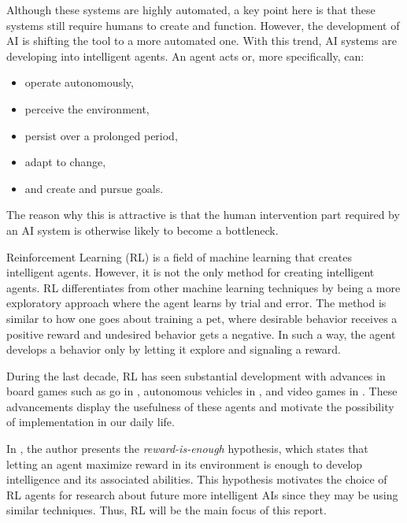 \documentclass[12pt,A4]{report}
\theoremstyle{definition}
\begin{document}
Although these systems are highly automated, a key point here is that these systems still require humans to create and function. However, the development of AI is shifting the tool to a more automated one. With this trend, AI systems are developing into intelligent agents. An agent acts or, more specifically, can:
\begin{itemize}
  \item operate autonomously,
  \item perceive the environment,
  \item persist over a prolonged period,
  \item adapt to change,
  \item and create and pursue goals.
\end{itemize}
The reason why this is attractive is that the human intervention part required by an AI system is otherwise likely to become a bottleneck.

Reinforcement Learning (RL) is a field of machine learning that creates intelligent agents. However, it is not the only method for creating intelligent agents. RL differentiates from other machine learning techniques by being a more exploratory approach where the agent learns by trial and error. The method is similar to how one goes about training a pet, where desirable behavior receives a positive reward and undesired behavior gets a negative. In such a way, the agent develops a behavior only by letting it explore and signaling a reward. 

During the last decade, RL has seen substantial development with advances in board games such as go in \citet{Silver}, autonomous vehicles in \citet{Levinson}, and video games in \citet{Minh}. These advancements display the usefulness of these agents and motivate the possibility of implementation in our daily life. 

In \citet{Silver21}, the author presents the \textit{reward-is-enough} hypothesis, which states that letting an agent maximize reward in its environment is enough to develop intelligence and its associated abilities. This hypothesis motivates the choice of RL agents for research about future more intelligent AIs since they may be using similar techniques. Thus, RL will be the main focus of this report. 

\end{document}
